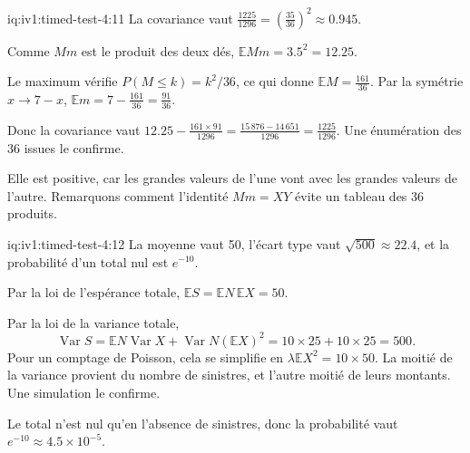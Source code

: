 \begin{solution}{iq:iv1:timed-test-4:11}
La covariance vaut $\frac{1225}{1296} = (\frac{35}{36})^2 \approx 0.945$.

Comme $Mm$ est le produit des deux dés, $\mathbb{E}Mm = 3.5^2 = 12.25$.

Le maximum vérifie $P(M \le k) = k^2/36$, ce qui donne $\mathbb{E}M = \frac{161}{36}$. Par la symétrie $x \to 7 - x$, $\mathbb{E}m = 7 - \frac{161}{36} = \frac{91}{36}$.

Donc la covariance vaut $12.25 - \frac{161 \times 91}{1296} = \frac{15\,876 - 14\,651}{1296} = \frac{1225}{1296}$. Une énumération des 36 issues le confirme.

Elle est positive, car les grandes valeurs de l'une vont avec les grandes valeurs de l'autre. Remarquons comment l'identité $Mm = XY$ évite un tableau des 36 produits.

\end{solution}

\begin{solution}{iq:iv1:timed-test-4:12}
La moyenne vaut 50, l'écart type vaut $\sqrt{500} \approx 22.4$, et la probabilité d'un total nul est $e^{-10}$.

Par la loi de l'espérance totale, $\mathbb{E}S = \mathbb{E}N\,\mathbb{E}X = 50$.

Par la loi de la variance totale,
\[
\operatorname{Var}S = \mathbb{E}N\operatorname{Var}X + \operatorname{Var}N(\mathbb{E}X)^2 = 10 \times 25 + 10 \times 25 = 500.
\]
Pour un comptage de Poisson, cela se simplifie en $\lambda\mathbb{E}X^2 = 10 \times 50$. La moitié de la variance provient du nombre de sinistres, et l'autre moitié de leurs montants. Une simulation le confirme.

Le total n'est nul qu'en l'absence de sinistres, donc la probabilité vaut $e^{-10} \approx 4.5 \times 10^{-5}$.


\end{solution}
